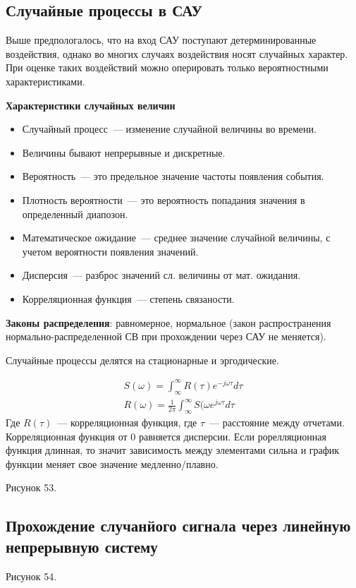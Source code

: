 \subsection{Случайные процессы в САУ}
Выше предпологалось, что на вход САУ поступают детерминированные воздействия, однако во многих случаях воздействия носят случайных характер. При оценке таких воздействий можно оперировать только вероятностными характеристиками. 

\textbf{Характеристики случайных величин}
\begin{itemize}
	\item Случайный процесс~--- изменение случайной величины во времени.
	\item Величины бывают непрерывные и дискретные.
	\item Вероятность~--- это предельное значение частоты появления события.
	\item Плотность вероятности~--- это вероятность попадания значения в определенный диапозон.
	\item Математическое ожидание~--- среднее значение случайной величины, с учетом вероятности появления значений.
	\item Дисперсия~--- разброс значений сл. величины от мат. ожидания.
	\item Корреляционная функция~--- степень связаности.
\end{itemize}

\textbf{Законы распределения}: равномерное, нормальное (закон распространения нормально-распределенной СВ при прохождении через САУ не меняется).

Случайные процессы делятся на стационарные и эргодические.


\begin{align*}
	S(\omega)=\int^{\infty}_{\infty}R(\tau)e^{-j\omega{}\tau}d\tau \\
	R(\omega) =\frac1{2\pi}\int^{\infty}_{\infty}S(\omega{}e^{j\omega{}\tau}d\tau
\end{align*}
Где $R(\tau)$~--- корреляционная функция, где $\tau$~--- расстояние между отчетами. Корреляционная функция от 0 равняется дисперсии. Если рорелляционная функция длинная, то значит зависимость между элементами сильна и график функции меняет свое значение медленно/плавно.

Рисунок 53.

\subsection{Прохождение случанйого сигнала через линейную непрерывную систему}
Рисунок 54.

